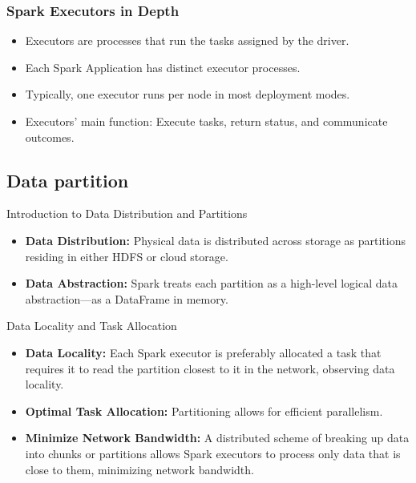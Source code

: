 \begin{frame}
    \frametitle{Spark Executors in Depth}
    \begin{itemize}
        \item Executors are processes that run the tasks assigned by the driver.
        \item Each Spark Application has distinct executor processes.
        \item Typically, one executor runs per node in most deployment modes.
        \item Executors' main function: Execute tasks, return status, and communicate outcomes.
    \end{itemize}
\end{frame}


\subsection{Data partition}\label{subsec:data-partition}


\begin{frame}{Introduction to Data Distribution and Partitions}
    \begin{itemize}
        \item \textbf{Data Distribution:} Physical data is distributed across storage as partitions residing in either HDFS or cloud storage.
        \item \textbf{Data Abstraction:} Spark treats each partition as a high-level logical data abstraction—as a DataFrame in memory.
    \end{itemize}
\end{frame}

\begin{frame}{Data Locality and Task Allocation}
    \begin{itemize}
        \item \textbf{Data Locality:} Each Spark executor is preferably allocated a task that requires it to read the partition closest to it in the network, observing data locality.
        \item \textbf{Optimal Task Allocation:} Partitioning allows for efficient parallelism.
        \item \textbf{Minimize Network Bandwidth:} A distributed scheme of breaking up data into chunks or partitions allows Spark executors to process only data that is close to them, minimizing network bandwidth.
    \end{itemize}
\end{frame}

